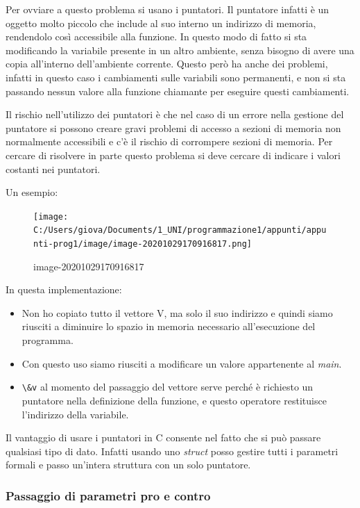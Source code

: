 \documentclass[
  paper=a4,
  oneside  ,captions=tableheading
]{scrbook}
\newcommand{\passthrough}[1]{#1}
\begin{document}
Per ovviare a questo problema si usano i puntatori. Il puntatore infatti
è un oggetto molto piccolo che include al suo interno un indirizzo di
memoria, rendendolo così accessibile alla funzione. In questo modo di
fatto si sta modificando la variabile presente in un altro ambiente,
senza bisogno di avere una copia all'interno dell'ambiente corrente.
Questo però ha anche dei problemi, infatti in questo caso i cambiamenti
sulle variabili sono permanenti, e non si sta passando nessun valore
alla funzione chiamante per eseguire questi cambiamenti.

Il rischio nell'utilizzo dei puntatori è che nel caso di un errore nella
gestione del puntatore si possono creare gravi problemi di accesso a
sezioni di memoria non normalmente accessibili e c'è il rischio di
corrompere sezioni di memoria. Per cercare di risolvere in parte questo
problema si deve cercare di indicare i valori costanti nei puntatori.

Un esempio:

\begin{figure}
\centering
\texttt{[image: C:/Users/giova/Documents/1\_UNI/programmazione1/appunti/appunti-prog1/image/image-20201029170916817.png]}
\caption{image-20201029170916817}
\end{figure}

In questa implementazione:

\begin{itemize}
\item
  Non ho copiato tutto il vettore V, ma solo il suo indirizzo e quindi
  siamo riusciti a diminuire lo spazio in memoria necessario
  all'esecuzione del programma.
\item
  Con questo uso siamo riusciti a modificare un valore appartenente al
  \emph{main}.
\item
  \passthrough{\lstinline!\&v!} al momento del passaggio del vettore
  serve perché è richiesto un puntatore nella definizione della
  funzione, e questo operatore restituisce l'indirizzo della variabile.
\end{itemize}

Il vantaggio di usare i puntatori in C consente nel fatto che si può
passare qualsiasi tipo di dato. Infatti usando uno \emph{struct} posso
gestire tutti i parametri formali e passo un'intera struttura con un
solo puntatore.

\hypertarget{passaggio-di-parametri-pro-e-contro}{%
\subsubsection{Passaggio di parametri pro e
contro}\label{passaggio-di-parametri-pro-e-contro}}
\end{document}
